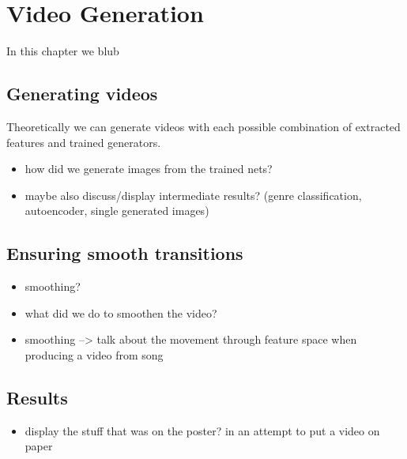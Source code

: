 \chapter{Video Generation}\label{ch:process}

    In this chapter we blub

    \section{Generating videos}
        
        Theoretically we can generate videos with each possible combination of extracted features and trained generators.

        \begin{itemize}
            \item how did we generate images from the trained nets?
            \item maybe also discuss/display intermediate results? (genre classification, autoencoder, single generated images)
        \end{itemize}

    \section{Ensuring smooth transitions}
        
        \begin{itemize}
            \item smoothing?
            \item what did we do to smoothen the video?
            \item smoothing --> talk about the movement through feature space when producing a video from song
        \end{itemize}

    \section{Results}

        \begin{itemize}
            \item display the stuff that was on the poster? in an attempt to put a video on paper
        \end{itemize}
